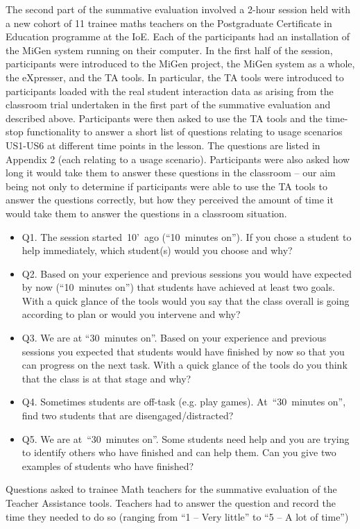 The second part of the summative evaluation involved a 2-hour session
held with a new cohort of 11 trainee maths teachers on the
Postgraduate Certificate in Education programme at the IoE. Each of
the participants had an installation of the MiGen system running on
their computer. In the first half of the session, participants were
introduced to the MiGen project, the MiGen system as a whole, the
eXpresser, and the TA tools. In particular, the TA tools were
introduced to participants loaded with the real student interaction
data as arising from the classroom trial undertaken in the first part
of the summative evaluation and described above. Participants were
then asked to use the TA tools and the time-stop functionality to
answer a short list of questions relating to usage scenarios US1-US6
at different time points in the lesson. The questions are listed in
Appendix 2 (each relating to a usage scenario). 
Participants were also asked how long it would take them to
answer these questions in the classroom – our aim being not only to
determine if participants were able to use the TA tools to answer the
questions correctly, but how they perceived the amount of time it
would take them to answer the questions in a classroom situation. 

\begin{table}[tb]
  \centering
  \begin{framed}
  \begin{itemize}
  \item Q1. The session started~10’~ago (“10~minutes on”). If you chose a
    student to help immediately, which student(s) would you choose and
    why?
  \item Q2. Based on your experience and previous sessions you would have
    expected by now (“10~minutes on”) that students have achieved at
    least two goals. With a quick glance of the tools would you say
    that the class overall is going according to plan or would you
    intervene and why?
  \item Q3. We are at “30~minutes on”. Based on your experience and
    previous sessions you expected that students would have finished
    by now so that you can progress on the next task. With a quick
    glance of the tools do you think that the class is at that stage
    and why?
  \item Q4. Sometimes students are off-task (e.g. play
    games). At~“30~minutes on”, find two students that are
    disengaged/distracted?
  \item Q5. We are at~“30~minutes on”. Some students need help and you are
    trying to identify others who have finished and can help them. Can
    you give two examples of students who have finished? 
  \end{itemize}    
  \end{framed}
  \vspace{-1em}
  \caption{Questions asked to trainee Math teachers for the summative
    evaluation of the Teacher Assistance tools. Teachers had to answer
    the question and record the time they needed to do so (ranging
    from ``1 -- Very little'' to ``5 -- A lot of time'')} 
  \label{fig:questions-pgce}
\end{table}

